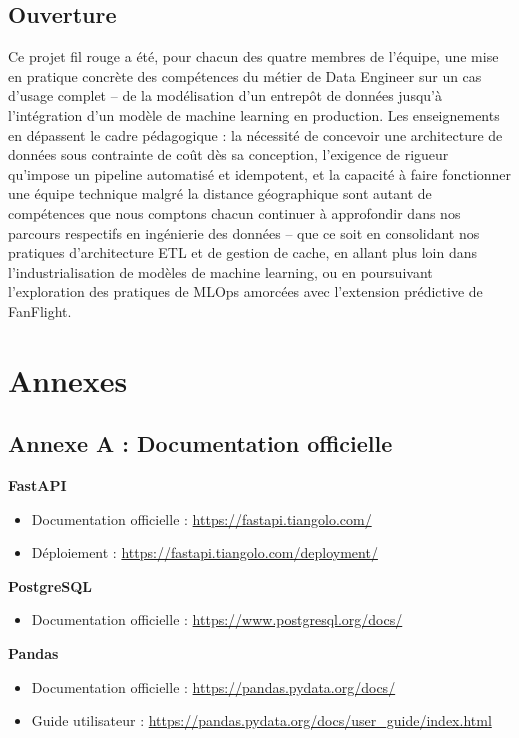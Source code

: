 \documentclass[11pt,a4paper]{report}
\begin{document}
\section{Ouverture}

Ce projet fil rouge a été, pour chacun des quatre membres de l'équipe, une mise en pratique concrète des compétences du métier de Data Engineer sur un cas d'usage complet -- de la modélisation d'un entrepôt de données jusqu'à l'intégration d'un modèle de machine learning en production. Les enseignements en dépassent le cadre pédagogique : la nécessité de concevoir une architecture de données sous contrainte de coût dès sa conception, l'exigence de rigueur qu'impose un pipeline automatisé et idempotent, et la capacité à faire fonctionner une équipe technique malgré la distance géographique sont autant de compétences que nous comptons chacun continuer à approfondir dans nos parcours respectifs en ingénierie des données -- que ce soit en consolidant nos pratiques d'architecture ETL et de gestion de cache, en allant plus loin dans l'industrialisation de modèles de machine learning, ou en poursuivant l'exploration des pratiques de MLOps amorcées avec l'extension prédictive de FanFlight.

\chapter*{Annexes}

\section*{Annexe A : Documentation officielle}

\textbf{FastAPI}
\begin{itemize}
  \item Documentation officielle : \url{https://fastapi.tiangolo.com/}
  \item Déploiement : \url{https://fastapi.tiangolo.com/deployment/}
\end{itemize}

\textbf{PostgreSQL}
\begin{itemize}
  \item Documentation officielle : \url{https://www.postgresql.org/docs/}

\end{itemize}

\textbf{Pandas}
\begin{itemize}
  \item Documentation officielle : \url{https://pandas.pydata.org/docs/}
  \item Guide utilisateur : \url{https://pandas.pydata.org/docs/user_guide/index.html}
\end{itemize}
\end{document}

